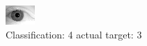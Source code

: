 \begin{figure}[h!]
\begin{center}
\includegraphics[width=0.60\columnwidth]{figures/ID2071_class_4_target_3.png}
\end{center}
\caption{ Classification: 4 actual target: 3}
\label{fig:ID2071_class_4_target_3}
\end{figure}
